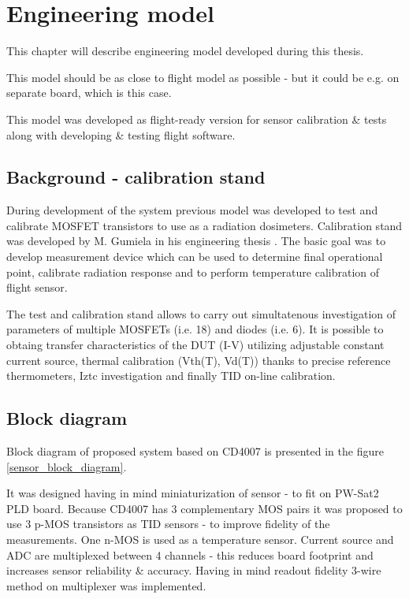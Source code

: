 \chapter{Engineering model}
\label{Engineering_model_chapter}
This chapter will describe engineering model developed during this thesis.

This model should be as close to flight model as possible - but it could be e.g. on separate board, which is this case.

This model was developed as flight-ready version for sensor calibration \& tests along with developing \& testing flight software.

\section{Background - calibration stand}
    During development of the system previous model was developed to test and calibrate MOSFET transistors to use as a radiation dosimeters. Calibration stand was developed by M. Gumiela in his engineering thesis \cite{MGThesis}. The basic goal was to develop measurement device which can be used to determine final operational point, calibrate radiation response and to perform temperature calibration of flight sensor.

    The test and calibration stand allows to carry out simultatenous investigation of parameters of multiple MOSFETs (i.e. 18) and diodes (i.e. 6). It is possible to obtaing transfer characteristics of the DUT (I-V) utilizing adjustable constant current source, thermal calibration (Vth(T), Vd(T)) thanks to precise reference thermometers, Iztc investigation and finally TID on-line calibration.


\section{Block diagram}
    Block diagram of proposed system based on CD4007 is presented in the figure \ref{sensor_block_diagram}.

    It was designed having in mind miniaturization of sensor - to fit on PW-Sat2 PLD board. Because CD4007 has 3 complementary MOS pairs it was proposed to use 3 p-MOS transistors as TID sensors - to improve fidelity of the measurements. One n-MOS is used as a temperature sensor. Current source and ADC are multiplexed between 4 channels - this reduces board footprint and increases sensor reliability \& accuracy. Having in mind readout fidelity 3-wire method on multiplexer was implemented.

